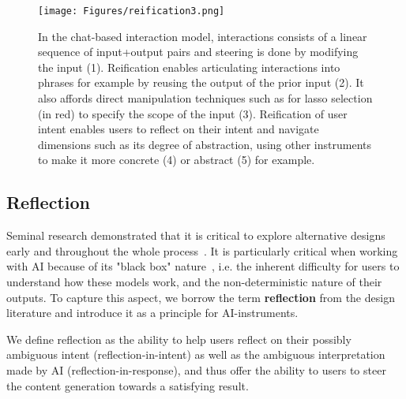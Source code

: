 \begin{figure}[t]
    \centering
\texttt{[image: Figures/reification3.png]}
\caption{In the chat-based interaction model, interactions consists of a linear sequence of input+output pairs and steering is done by modifying the input (1). Reification enables articulating interactions into phrases for example by reusing the output of the prior input (2). It also affords direct manipulation techniques such as for lasso selection (in red) to specify the scope of the input (3). Reification of user intent enables users to reflect on their intent and navigate dimensions such as its degree of abstraction, using other instruments to make it more concrete (4) or abstract (5) for example.}
    \label{fig:reification}
\end{figure}


\subsection{Reflection}


Seminal research demonstrated that it is critical to explore alternative designs early and throughout the whole process~\cite{tohidi2006getting, DesignGalleries1997}. It is particularly critical when working with AI because of its "black box" nature~\cite{bathaee2017artificial,hoffman2018explaining}, i.e. the inherent difficulty for users to understand how these models work, and the non-deterministic nature of their outputs.  To capture this aspect, we borrow the term \textbf{reflection} from the design literature and introduce it as a principle for AI-instruments. 

We define reflection as the ability to help users reflect on their possibly ambiguous intent (reflection-in-intent) as well as the ambiguous interpretation made by AI (reflection-in-response), and thus offer the ability to users to steer the content generation towards a satisfying result. 



